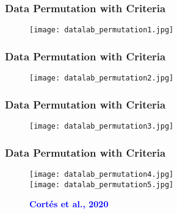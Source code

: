 \documentclass[11pt]{beamer}
\newcommand{\citav}[2]{\textbf{\textcolor{blue}{#1 et al., #2}}}
\begin{document}
\begin{frame}[fragile]
  \frametitle{\normalsize{\textbf{
    Data Permutation with Criteria
  }}} 

  \scriptsize{  

    \begin{figure}[h!]
      \centering
      \texttt{[image: datalab\_permutation1.jpg]}
    \end{figure}

  }
\end{frame}

\begin{frame}[fragile]
  \frametitle{\normalsize{\textbf{
    Data Permutation with Criteria
  }}} 

  \scriptsize{  

    \begin{figure}[h!]
      \centering
      \texttt{[image: datalab\_permutation2.jpg]}
    \end{figure}

  }
\end{frame}

\begin{frame}[fragile]
  \frametitle{\normalsize{\textbf{
    Data Permutation with Criteria
  }}} 

  \scriptsize{  

    \begin{figure}[h!]
      \texttt{[image: datalab\_permutation3.jpg]}
    \end{figure}

  }
\end{frame}

\begin{frame}[fragile]
  \frametitle{\normalsize{\textbf{
    Data Permutation with Criteria
  }}} 

  \scriptsize{  

    \begin{figure}[h!]
      \centering
      \texttt{[image: datalab\_permutation4.jpg]} \\
      \texttt{[image: datalab\_permutation5.jpg]}
      \caption*{\citav{Cortés}{2020}}
    \end{figure}

  }
\end{frame}
\end{document}
